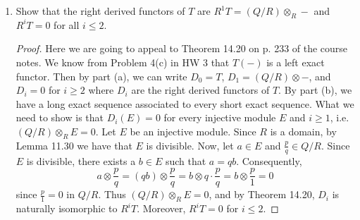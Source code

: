\documentclass[11pt,oneside,english]{amsart}
\theoremstyle{definition}
\begin{document}
\begin{enumerate}[leftmargin=*]
\begin{enumerate}
\begin{proof}
Consider the following diagram.
\[
\xymatrix{0 \ar[r] & T(A) \ar[r] \ar[d] & T(B) \ar[r] \ar[d] & T(C) \ar[d] & \\
0 \ar[r] & A \ar[r]\ar[d] & B \ar[r]\ar[d] & C \ar[r]\ar[d] & 0\\
0 \ar[r] & Q\otimes A \ar[r]\ar[d] & Q\otimes B \ar[r]\ar[d] & Q\otimes C \ar[r]\ar[d] & 0\\
 & (Q/R)\otimes A \ar[r] & (Q/R)\otimes B \ar[r] & (Q/R)\otimes C \ar[r] & 0\\}
\]
By part (a), we know that $T(M)=\ker(M\to M\otimes Q)$, so the top line is a sequence of kernels. Additionally, as we see in the second sequence in part (a), $M\otimes (Q/R)$ is the cokernel of the map $M\to M\otimes Q$, so the vertical sequences in the diagram are actually exact, yielding the diagram
\[
\xymatrix{
 & 0 \ar[d] & 0 \ar[d] & 0 \ar[d]\\
0 \ar[r] & T(A) \ar[r] \ar[d] & T(B) \ar[r] \ar[d] & T(C) \ar[d] & \\
0 \ar[r] & A \ar[r]\ar[d] & B \ar[r]\ar[d] & C \ar[r]\ar[d] & 0\\
0 \ar[r] & Q\otimes A \ar[r]\ar[d] & Q\otimes B \ar[r]\ar[d] & Q\otimes C \ar[r]\ar[d] & 0\\
 & (Q/R)\otimes A \ar[r]\ar[d] & (Q/R)\otimes B \ar[r]\ar[d] & (Q/R)\otimes C \ar[r]\ar[d] & 0\\
 & 0 & 0 & 0\\}
\]
Thus by the snake lemma, there is a connecting homomorphism $T(C)\to(Q/R)\otimes A$, yielding the exact sequence
\[
\xymatrix{0 \ar[r] & T(A) \ar[r] & T(B) \ar[r] & T(C) \ar[r] & (Q/R)\otimes A \ar[r] & (Q/R)\otimes B \ar[r] & (Q/R)\otimes C \ar[r] & 0}
\]
\end{proof}

\item Show that the right derived functors of $T$ are $R^1T = (Q/R) \otimes_R -$ and $R^iT = 0$ for all $i \leqslant 2$.

\begin{proof}
Here we are going to appeal to Theorem 14.20 on p. 233 of the course notes. We know from Problem 4(c) in HW 3 that $T(-)$ is a left exact functor. Then by part (a), we can write $D_0=T$, $D_1=(Q/R)\otimes -$, and $D_i=0$ for $i\geq 2$ where $D_i$ are the right derived functors of $T$. By part (b), we have a long exact sequence associated to every short exact sequence. What we need to show is that $D_i(E)=0$ for every injective module $E$ and $i\geq1$, i.e. $(Q/R)\otimes_R E=0$. Let $E$ be an injective module. Since $R$ is a domain, by Lemma 11.30 we have that $E$ is divisible. Now, let $a\in E$ and $\frac{p}{q}\in Q/R$. Since $E$ is divisible, there exists a $b\in E$ such that $a=qb$. Consequently,
\[
a\otimes \frac{p}{q}=(qb)\otimes \frac{p}{q}=b\otimes q\cdot\frac{p}{q}=b\otimes\frac{p}{1}=0
\]
since $\frac{p}{1}=0$ in $Q/R$. Thus $(Q/R)\otimes_R E=0$, and by Theorem 14.20, $D_i$ is naturally isomorphic to $R^iT$. Moreover, $R^iT=0$ for $i\leq 2$.
\end{proof}
\end{enumerate}


\end{enumerate}
\end{document}
